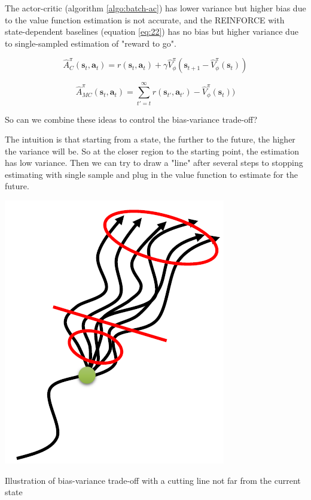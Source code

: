 \documentclass{tufte-handout}
\newcommand{\s}{\mathbf{s}}
\newcommand{\act}{\mathbf{a}}
\begin{document}
The actor-critic (algorithm \ref{algo:batch-ac}) has lower variance but higher bias due to the value function estimation is not accurate, and the
REINFORCE with state-dependent baselines (equation \ref{eq:22}) has no bias but higher variance due to single-sampled estimation of "reward to go".

\begin{equation}
\label{eq:26}
\hat{A}_C^\pi (\s_t, \act_t) = r(\s_t, \act_t) + \gamma \hat{V} ^\pi_\phi(\s_{t+1} - \hat{V}^\pi_\phi(\s_t))
\end{equation}

\begin{equation}
\label{eq:27}
\hat{A}_{MC}^\pi (\s_t, \act_t) = \sum_{t'=t}^\infty r(\s_{t'}, \act_{t'}) - \hat{V}^\pi_\phi(\s_t))
\end{equation}

So can we combine these ideas to control the bias-variance trade-off?

The intuition is that starting from a state, the further to the future, the higher the variance will be. So at the closer region to the starting point, the estimation has low variance. Then we can try to draw a "line" after several steps to stopping estimating with single sample and plug in the value function to estimate for the future.

\begin{marginfigure}
\centering
\includegraphics[width=\linewidth]{n-step}
\caption{Illustration of bias-variance trade-off with a cutting line not far from the current state}
\label{fig:n-step}
\end{marginfigure}
\end{document}
